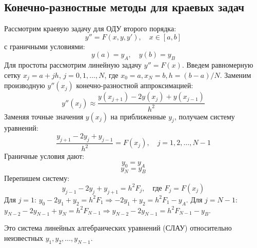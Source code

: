 \subsection{Конечно-разностные методы для краевых задач}
Рассмотрим краевую задачу для ОДУ второго порядка:
\[ y'' = F(x, y, y'), \quad x \in [a,b] \]
с граничными условиями:
\[ y(a) = y_A, \quad y(b) = y_B \]
Для простоты рассмотрим линейную задачу $y'' = F(x)$.
Введем равномерную сетку $x_j = a + jh$, $j=0, 1, \dots, N$, где $x_0=a, x_N=b, h=(b-a)/N$.
Заменим производную $y''(x_j)$ конечно-разностной аппроксимацией:
\[ y''(x_j) \approx \frac{y(x_{j+1}) - 2y(x_j) + y(x_{j-1})}{h^2} \]
Заменяя точные значения $y(x_j)$ на приближенные $y_j$, получаем систему уравнений:
\[ \frac{y_{j+1} - 2y_j + y_{j-1}}{h^2} = F(x_j), \quad j = 1, 2, \dots, N-1 \]
Граничные условия дают:
\[ y_0 = y_A \]
\[ y_N = y_B \]
Перепишем систему:
\[ y_{j-1} - 2y_j + y_{j+1} = h^2 F_j, \quad \text{где } F_j = F(x_j) \]
Для $j=1$: $y_0 - 2y_1 + y_2 = h^2 F_1 \Rightarrow -2y_1 + y_2 = h^2 F_1 - y_A$.
Для $j=N-1$: $y_{N-2} - 2y_{N-1} + y_N = h^2 F_{N-1} \Rightarrow y_{N-2} - 2y_{N-1} = h^2 F_{N-1} - y_B$.

Это система линейных алгебраических уравнений (СЛАУ) относительно неизвестных $y_1, y_2, \dots, y_{N-1}$.  
